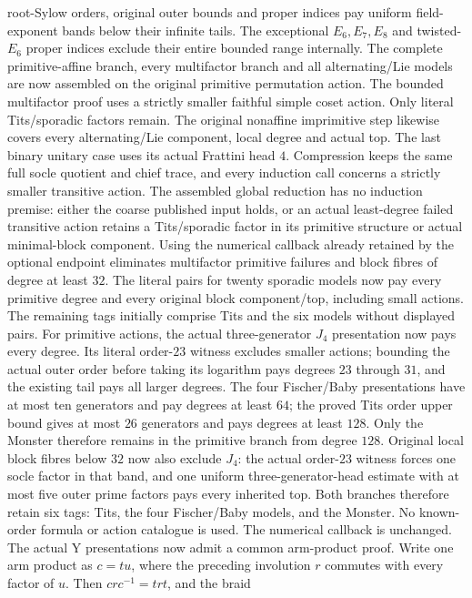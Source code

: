 root-Sylow orders, original outer bounds and proper indices pay uniform
field-exponent bands below their infinite tails. The exceptional
$E_6,E_7,E_8$ and twisted-$E_6$ proper indices exclude their entire
bounded range internally. The complete primitive-affine branch, every
multifactor branch and all alternating/Lie models are now assembled
on the original primitive permutation action. The bounded multifactor
proof uses a strictly smaller faithful simple coset action. Only
literal Tits/sporadic factors remain.
The original nonaffine imprimitive step likewise covers every
alternating/Lie component, local degree and actual top. The last binary
unitary case uses its actual Frattini head $4$. Compression keeps the
same full socle quotient and chief trace, and every induction call
concerns a strictly smaller transitive action. The assembled global
reduction has no induction premise: either the coarse published input
holds, or an actual least-degree failed transitive action retains a
Tits/sporadic factor in its primitive structure or actual minimal-block
component. Using the numerical callback already retained by the optional
endpoint eliminates multifactor primitive failures and block fibres
of degree at least $32$. The literal pairs for twenty sporadic models
now pay every primitive degree and every original block component/top,
including small actions. The remaining tags initially comprise Tits
and the six models without displayed pairs. For primitive actions, the actual
three-generator $J_4$ presentation now pays every degree. Its literal
order-$23$ witness excludes smaller actions; bounding the actual outer
order before taking its logarithm pays degrees $23$ through $31$, and
the existing tail pays all larger degrees. The four Fischer/Baby presentations have at most ten generators and pay
degrees at least $64$; the proved Tits order upper bound gives at most
$26$ generators and pays degrees at least $128$. Only the Monster
therefore remains in the primitive branch from degree $128$. Original
local block fibres below $32$ now also exclude $J_4$: the actual
order-$23$ witness forces one socle factor in that band, and one uniform
three-generator-head estimate with at most five outer prime factors
pays every inherited top. Both branches therefore retain six tags:
Tits, the four Fischer/Baby models, and the Monster. No known-order
formula or action catalogue is used. The numerical callback is unchanged.
The actual Y presentations now admit a common arm-product proof.
Write one arm product as $c=tu$, where the preceding involution $r$
commutes with every factor of $u$. Then $crc^{-1}=trt$, and the braid
